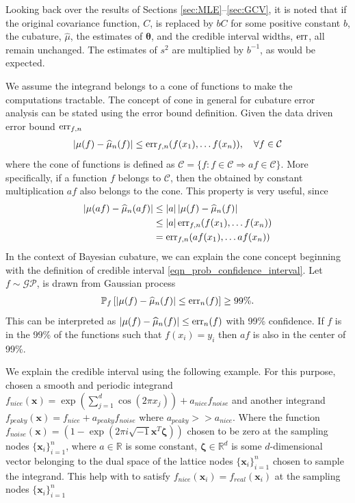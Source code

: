 \documentclass{iitthesis}          %
\newcommand{\bm}[1]{\boldsymbol{#1}}
\newcommand{\vtheta}{{\bm{\theta}}}
\newcommand{\vzeta}{{\bm{\zeta}}}
\newcommand{\vx}{\bm{x}}
\newcommand{\hmu}{\widehat{\mu}}
\newcommand{\err}{\textup{err}}
\def\abs#1{\ensuremath{\left \lvert #1 \right \rvert}}
\begin{document}
Looking back over the results of Sections  \ref{sec:MLE}--\ref{sec:GCV}, it is noted that if the original covariance function, $C$, is replaced by $b C$ for some positive constant $b$, the cubature, $\hmu$, the estimates of $\vtheta$, and the credible interval widths, $\err$, all remain unchanged.  The estimates of $s^2$ are multiplied by $b^{-1}$, as would be expected. 


We assume the integrand belongs to a cone of functions to make the computations tractable. The concept of cone in general for cubature error analysis can be stated using the error bound definition. Given the data driven error bound $\err_{f,n}$
\begin{align*}
\abs{\mu(f) - \hmu_n(f)} \le \err_{f,n}(f(x_1), \dots f(x_n)), \quad \forall f \in \mathcal{C}
\end{align*}  
where the cone of functions is defined as $\mathcal{C} = \{f : f \in \mathcal{C} \Rightarrow a f \in \mathcal{C} \}$. More specifically, if a function $f$ belongs to $\mathcal{C}$, then the obtained by constant multiplication $af$ also belongs to the cone. This property is very useful, since
\begin{align*}
\abs{\mu(a f) - \hmu_n(a f)} &\le \abs{a} \abs{\mu(f) - \hmu_n(f)} \\
& \le \abs{a} \err_{f,n}(f(x_1), \dots f(x_n)) \\
& = \err_{f,n}(a f(x_1), \dots a f(x_n)) \\
\end{align*}
In the context of Bayesian cubature, we can explain the cone concept beginning with the definition of credible interval \eqref{eqn_prob_confidence_interval}. 
Let $f \sim \mathcal{GP}$, is drawn from  Gaussian process
\begin{align*}
\mathbb{P}_f \left[
|\mu(f)-\hmu_n(f)| \leq \err_{n}(f) \right] \ge 99\%.
\end{align*}
This can be interpreted as $|\mu(f)-\hmu_n(f)| \leq \err_{n}(f)$ with 99\% confidence. If $f$ is in the 99\%  of the functions such that $f(x_i) = y_i$ then $af$ is also in the center of 99\%.

We explain the credible interval using the following example. For this purpose, chosen a smooth and periodic integrand $f_{nice}(\vx) = \exp(\sum_{j=1}^{d} \cos(2\pi x_j)) + a_{nice} f_{noise}$ and another integrand $f_{peaky}(\vx) = f_{nice} + a_{peaky} f_{noise}$ where $a_{peaky} >> a_{nice}$. Where the function $f_{noise}(\vx) = (1 - \exp(2\pi i \sqrt{-1} \vx^T \vzeta))$ chosen to be zero at the sampling nodes $\{ \vx_i\}_{i=1}^n$, where $a \in \mathbb{R}$ is some constant, $\vzeta \in \mathbb{R}^d$ is some $d$-dimensional vector belonging to the dual space of the lattice nodes $\{ \vx_i\}_{i=1}^n$ chosen to sample the integrand. This help with to satisfy $f_{nice}(\vx_i) = f_{real}(\vx_i) $ at the sampling nodes $\{ \vx_i\}_{i=1}^n$
\end{document}
